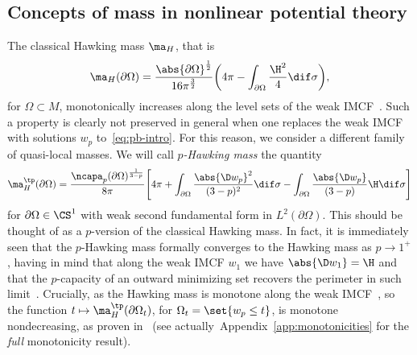 \subsection{Concepts of mass in nonlinear potential theory}
The classical Hawking mass $\ma_H$, that is
\begin{equation}\label{eq:hawking-mass}
 \ma_{H}(\partial \Omega)= \frac{ \abs{ \partial \Omega}^{\frac{1}{2}}}{16 \pi^{\frac{3}{2}}} \bigg( 4 \pi - \int_{\partial \Omega}\frac{\H^2}{4} \dif \sigma \bigg),
\end{equation}
for $\Omega\subset M$, monotonically increases along the level sets of the weak IMCF~\cite{huisken_inversemeancurvatureflow_2001}. Such a property is clearly not preserved in general when one replaces the weak IMCF with solutions $w_p$ to~\eqref{eq:pb-intro}. For this reason, we consider a different family of quasi-local masses. We will call \emph{$p$-Hawking mass} the quantity
\begin{equation}\label{eq:p-Hawkingmass}
 \ma_H^{\tp}(\partial \Omega) = \frac{\ncapa_p(\partial \Omega)^{\frac{1}{3-p}}}{8 \pi}\Bigg[4\pi + \int_{\partial \Omega}\frac{\abs{\D w_p}^2}{(3-p)^2}\dif \sigma - \int_{\partial \Omega}\frac{\abs{ \D w_p} }{(3-p)}\H \dif \sigma \Bigg]
\end{equation}
for $\partial \Omega \in \CS^{1}$ with weak second fundamental form in $L^2(\partial \Omega)$. This should be thought of as a $p$-version of the classical Hawking mass. In fact, it is immediately seen that the $p$-Hawking mass formally converges to the Hawking mass as $p \to 1^+$, having in mind that along the weak IMCF $w_1$ we have $\abs{\D w_1} = \H$ and that the $p$-capacity of an outward minimizing set recovers the perimeter in such limit~\cite[Theorem 1.2]{fogagnolo_minimisinghullscapacityisoperimetric_2022}.
Crucially, as the Hawking mass is monotone along the weak IMCF~\cite[Geroch Monotonicity Formula 5.8]{huisken_inversemeancurvatureflow_2001},
 so the function $t \mapsto \ma_H^{\tp}(\partial \Omega_t)$, for $\Omega_t= \set{w_p \leq t}$, is monotone nondecreasing, as proven in~\cite{agostiniani_riemannianpenroseinequalitynonlinear_2022} (see actually~Appendix~\ref{app:monotonicities} for the \emph{full} monotonicity result).
